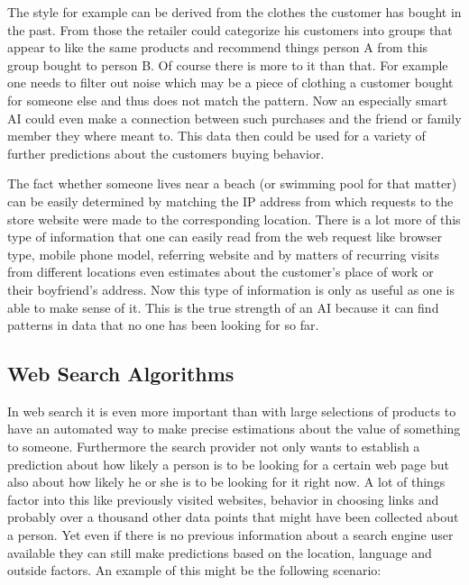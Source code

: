 The style for example can be derived from the clothes the customer has bought in the past. From those the retailer could categorize his customers into groups that appear to like the same products and recommend things person A from this group bought to person B. Of course there is more to it than that. For example one needs to filter out noise which may be a piece of clothing a customer bought for someone else and thus does not match the pattern. Now an especially smart AI could even make a connection between such purchases and the friend or family member they where meant to. This data then could be used for a variety of further predictions about the customers buying behavior.

The fact whether someone lives near a beach (or swimming pool for that matter) can be easily determined by matching the IP address from which requests to the store website were made to the corresponding location. There is a lot more of this type of information that one can easily read from the web request like browser type, mobile phone model, referring website and by matters of recurring visits from different locations even estimates about the customer's place of work or their boyfriend's address. Now this type of information is only as useful as one is able to make sense of it. This is the true strength of an AI because it can find patterns in data that no one has been looking for so far.

\subsection{Web Search Algorithms}

In web search it is even more important than with large selections of products to have an automated way to make precise estimations about the value of something to someone. Furthermore the search provider not only wants to establish a prediction about how likely a person is to be looking for a certain web page but also about how likely he or she is to be looking for it right now. A lot of things factor into this like previously visited websites, behavior in choosing links and probably over a thousand other data points that might have been collected about a person. Yet even if there is no previous information about a search engine user available they can still make predictions based on the location, language and outside factors. An example of this might be the following scenario:

